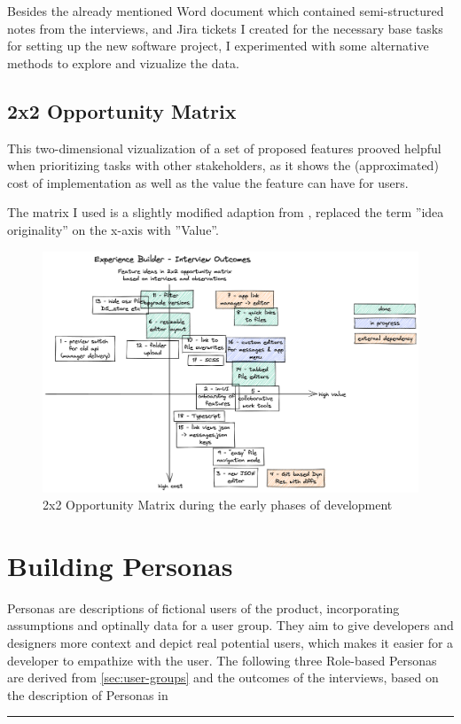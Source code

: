 Besides the already mentioned Word document which contained semi-structured notes from the interviews, and Jira tickets I created for the necessary base tasks for setting up the new software project, I experimented with some alternative methods to explore and vizualize the data.

\subsection{2x2 Opportunity Matrix}

This two-dimensional vizualization of a set of proposed features prooved helpful when prioritizing tasks with other stakeholders,
as it shows the (approximated) cost of implementation as well as the value the feature can have for users.

The matrix I used is a slightly modified adaption from \cite[p. 181]{LearnHCI:2020ys}, replaced the term ''idea originality'' on the x-axis with ''Value''.

\begin{figure}[ht]
	\centering
  \includegraphics[width=\textwidth]{pics/feature_cost_matrix.excalidraw.png}
	\caption{2x2 Opportunity Matrix during the early phases of development}
	\label{fig:opportunitymatrix}
\end{figure}


\section{Building Personas}
\label{sec:personas}

Personas are descriptions of fictional users of the product, incorporating assumptions and optinally data for a user group.
They aim to give developers and designers more context and depict real potential users, which makes it easier for a developer to empathize with the user.
The following three Role-based Personas are derived from \ref{sec:user-groups} and the outcomes of the interviews, based on the description of Personas in \cite[pp. 403-405]{Interactiondesign:2019ys}
\\
\hrule
